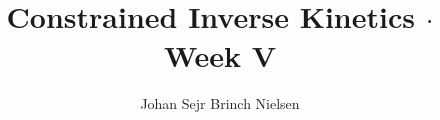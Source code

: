 \makeatletter %
\def\maketitle{%
 \null
 \thispagestyle{empty}%
 \vfill
 \begin{center}\leavevmode
   \normalfont
   \LARGE{\raggedleft \@title\par}%
   \hrulefill\par
   \large{\raggedleft \subtitle\par}%
   \vskip 2cm
   {\today\par}%
 \end{center}%
 \vfill
 \begin{flushleft}
   {\large \@author } \\
   {\footnotesize \suplementInfo }
 \end{flushleft}
 \clearpage %
}
\makeatother %
\title{Constrained Inverse Kinetics $\cdot$ Week V}

\def\subtitle{CCO $\cdot$ Constraint Continous Optimization}

\author{Johan Sejr Brinch Nielsen} \def\suplementInfo{

\kern 5pt \hrule width 11pc \kern 5pt

\begin{tabular}{ll}
Email: & zerrez@diku.dk  \\
Cpr.:  & 260886-2547
\end{tabular}

\kern 5pt \hrule width 11pc \kern 5pt

Dept. of Computer Science,  \\
University of Copenhagen

}

